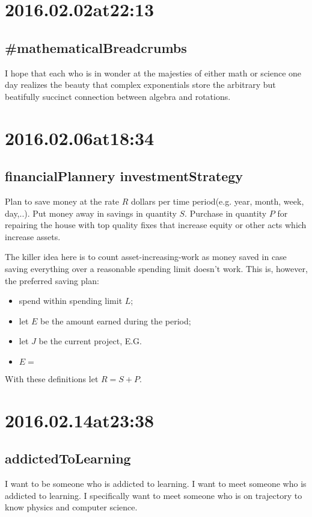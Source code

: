 \begin{enumerate}
\section*{ 2016.02.02at22:13 }
\subsection*{ \#mathematicalBreadcrumbs }
I hope that each who is in wonder at the majesties of either math or science one day realizes the beauty that complex exponentials store the arbitrary but beatifully succinct connection between algebra and rotations.

\section*{ 2016.02.06at18:34 }
\subsection*{ financialPlannery investmentStrategy }
Plan to save money at the rate $R$ dollars per time period(e.g. year, month, week, day,..). Put money away in savings in quantity $S$. Purchase in quantity $P$ for repairing the house with top quality fixes that increase equity or other acts which increase assets.

The killer idea here is to count asset-increasing-work as money saved in case saving everything over a reasonable spending limit doesn't work. This is, however, the preferred saving plan: 
\begin{itemize}
\item spend within spending limit $L$;
\item let $E$ be the amount earned during the period;
\item let $J$ be the current project, E.G. 
\item $E = $
\end{itemize}

With these definitions let $R=S+P$. 

\section*{ 2016.02.14at23:38 }
\subsection*{ addictedToLearning }
I want to be someone who is addicted to learning. I want to meet someone who is addicted to learning. I specifically want to meet someone who is on trajectory to know physics and computer science.


\end{enumerate}
